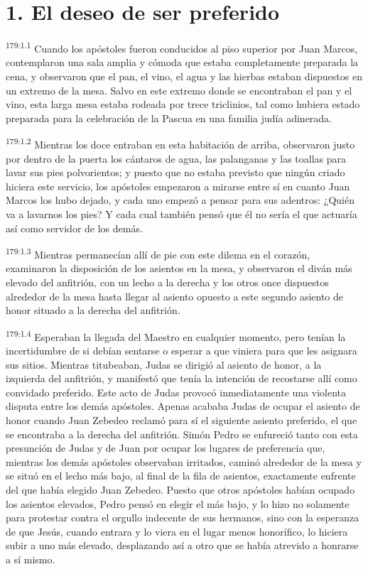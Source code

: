 \section*{1. El deseo de ser preferido}
\par 
\textsuperscript{179:1.1} Cuando los apóstoles fueron conducidos al piso superior por Juan Marcos, contemplaron una sala amplia y cómoda que estaba completamente preparada la cena, y observaron que el pan, el vino, el agua y las hierbas estaban dispuestos en un extremo de la mesa. Salvo en este extremo donde se encontraban el pan y el vino, esta larga mesa estaba rodeada por trece triclinios, tal como hubiera estado preparada para la celebración de la Pascua en una familia judía adinerada.

\par 
\textsuperscript{179:1.2} Mientras los doce entraban en esta habitación de arriba, observaron justo por dentro de la puerta los cántaros de agua, las palanganas y las toallas para lavar sus pies polvorientos; y puesto que no estaba previsto que ningún criado hiciera este servicio, los apóstoles empezaron a mirarse entre sí en cuanto Juan Marcos los hubo dejado, y cada uno empezó a pensar para sus adentros: ¿Quién va a lavarnos los pies? Y cada cual también pensó que él no sería el que actuaría así como servidor de los demás.

\par 
\textsuperscript{179:1.3} Mientras permanecían allí de pie con este dilema en el corazón, examinaron la disposición de los asientos en la mesa, y observaron el diván más elevado del anfitrión, con un lecho a la derecha y los otros once dispuestos alrededor de la mesa hasta llegar al asiento opuesto a este segundo asiento de honor situado a la derecha del anfitrión.

\par 
\textsuperscript{179:1.4} Esperaban la llegada del Maestro en cualquier momento, pero tenían la incertidumbre de si debían sentarse o esperar a que viniera para que les asignara sus sitios. Mientras titubeaban, Judas se dirigió al asiento de honor, a la izquierda del anfitrión, y manifestó que tenía la intención de recostarse allí como convidado preferido. Este acto de Judas provocó inmediatamente una violenta disputa entre los demás apóstoles. Apenas acababa Judas de ocupar el asiento de honor cuando Juan Zebedeo reclamó para sí el siguiente asiento preferido, el que se encontraba a la derecha del anfitrión. Simón Pedro se enfureció tanto con esta presunción de Judas y de Juan por ocupar los lugares de preferencia que, mientras los demás apóstoles observaban irritados, caminó alrededor de la mesa y se situó en el lecho más bajo, al final de la fila de asientos, exactamente enfrente del que había elegido Juan Zebedeo. Puesto que otros apóstoles habían ocupado los asientos elevados, Pedro pensó en elegir el más bajo, y lo hizo no solamente para protestar contra el orgullo indecente de sus hermanos, sino con la esperanza de que Jesús, cuando entrara y lo viera en el lugar menos honorífico, lo hiciera subir a uno más elevado, desplazando así a otro que se había atrevido a honrarse a sí mismo.

